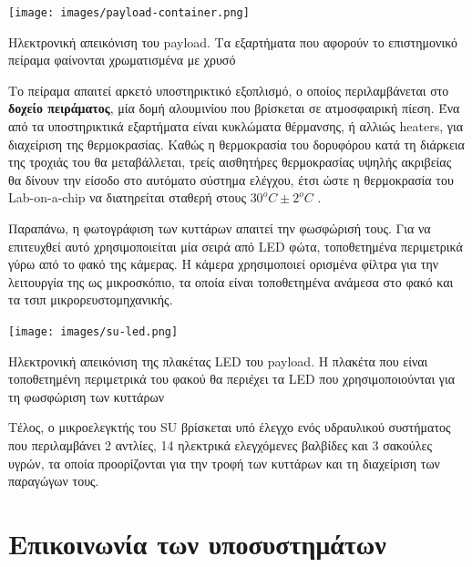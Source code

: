 \documentclass[a4paper,nobib,justified]{tufte-book}
\begin{document}
\begin{marginfigure}
	\texttt{[image: images/payload-container.png]}
	\label{fig:payload-container}
	\caption[Ηλεκτρονική απεικόνιση του payload]{Ηλεκτρονική απεικόνιση του payload. Τα εξαρτήματα που αφορούν το επιστημονικό πείραμα φαίνονται χρωματισμένα με χρυσό}
\end{marginfigure}
Το πείραμα απαιτεί αρκετό υποστηρικτικό εξοπλισμό, ο οποίος περιλαμβάνεται στο \textbf{δοχείο πειράματος}, μία δομή αλουμινίου που βρίσκεται σε ατμοσφαιρική πίεση. Ένα από τα υποστηρικτικά εξαρτήματα είναι κυκλώματα θέρμανσης, ή αλλιώς heaters, για διαχείριση της θερμοκρασίας. Καθώς η θερμοκρασία του δορυφόρου κατά τη διάρκεια της τροχιάς του θα μεταβάλλεται, τρείς αισθητήρες θερμοκρασίας υψηλής ακριβείας θα δίνουν την είσοδο στο αυτόματο σύστημα ελέγχου, έτσι ώστε η θερμοκρασία του Lab-on-a-chip να διατηρείται σταθερή στους $30^o C \pm 2^oC$ .

Παραπάνω, η φωτογράφιση των κυττάρων απαιτεί την φωσφώρισή τους. Για να επιτευχθεί αυτό χρησιμοποιείται μία σειρά από LED φώτα, τοποθετημένα περιμετρικά γύρω από το φακό της κάμερας. Η κάμερα χρησιμοποιεί ορισμένα φίλτρα για την λειτουργία της ως μικροσκόπιο, τα οποία είναι τοποθετημένα ανάμεσα στο φακό και τα τσιπ μικρορευστομηχανικής.

\begin{marginfigure}
	\texttt{[image: images/su-led.png]}
	\label{fig:su-led}
	\caption[Ηλεκτρονική απεικόνιση της πλακέτας LED του payload]{Ηλεκτρονική απεικόνιση της πλακέτας LED του payload. Η πλακέτα που είναι τοποθετημένη περιμετρικά του φακού θα περιέχει τα LED που χρησιμοποιούνται για τη φωσφώριση των κυττάρων}
\end{marginfigure}
Τέλος, ο μικροελεγκτής του SU βρίσκεται υπό έλεγχο ενός υδραυλικού συστήματος που περιλαμβάνει 2 αντλίες, 14 ηλεκτρικά ελεγχόμενες βαλβίδες και 3 σακούλες υγρών, τα οποία προορίζονται για την τροφή των κυττάρων και τη διαχείριση των παραγώγων τους.

\section{Επικοινωνία των υποσυστημάτων}
\end{document}
